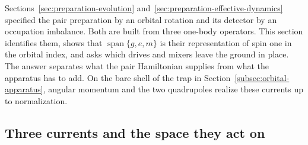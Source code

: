 \documentclass[11pt]{article}
\theoremstyle{definition}
\DeclareMathOperator{\Span}{span}
\begin{document}
Sections~\ref{sec:preparation-evolution} and~\ref{sec:preparation-effective-dynamics} specified the pair preparation by an orbital rotation and its detector by an occupation imbalance. Both are built from three one-body operators. This section identifies them, shows that $\Span\{g,e,m\}$ is their representation of spin one in the orbital index, and asks which drives and mixers leave the ground in place. The answer separates what the pair Hamiltonian supplies from what the apparatus has to add. On the bare shell of the trap in Section~\ref{subsec:orbital-apparatus}, angular momentum and the two quadrupoles realize these currents up to normalization.

\subsection{Three currents and the space they act on}
\label{subsec:pair-currents-triplet}
\end{document}
